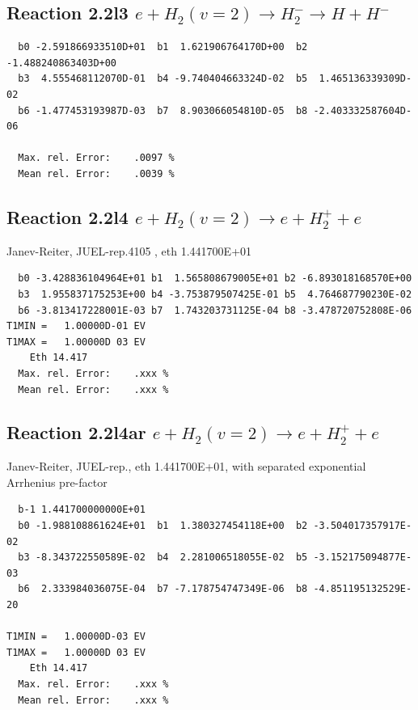 \documentclass[12pt,dvipdfmx]{article}
\begin{document}
\newpage

\subsection{
Reaction 2.2l3
 $ e + H_2(v=2) \rightarrow H_2^- \rightarrow H + H^-$
}


\begin{small}\begin{verbatim}
  b0 -2.591866933510D+01  b1  1.621906764170D+00  b2 -1.488240863403D+00
  b3  4.555468112070D-01  b4 -9.740404663324D-02  b5  1.465136339309D-02
  b6 -1.477453193987D-03  b7  8.903066054810D-05  b8 -2.403332587604D-06

  Max. rel. Error:    .0097 %
  Mean rel. Error:    .0039 %
\end{verbatim}\end{small}

\subsection{
Reaction 2.2l4
 $ e + H_2(v=2) \rightarrow e + H_2^+  + e$
}
Janev-Reiter, JUEL-rep.4105 \cite{kn:JRS}, eth 1.441700E+01

\begin{small}\begin{verbatim}
  b0 -3.428836104964E+01 b1  1.565808679005E+01 b2 -6.893018168570E+00
  b3  1.955837175253E+00 b4 -3.753879507425E-01 b5  4.764687790230E-02
  b6 -3.813417228001E-03 b7  1.743203731125E-04 b8 -3.478720752808E-06
T1MIN =   1.00000D-01 EV
T1MAX =   1.00000D 03 EV
    Eth 14.417
  Max. rel. Error:    .xxx %
  Mean rel. Error:    .xxx %
\end{verbatim}\end{small}

\subsection{
Reaction 2.2l4ar
 $ e + H_2(v=2) \rightarrow e + H_2^+  + e$
}
Janev-Reiter, JUEL-rep., eth 1.441700E+01,
with separated exponential Arrhenius pre-factor

\begin{small}\begin{verbatim}
  b-1 1.441700000000E+01
  b0 -1.988108861624E+01  b1  1.380327454118E+00  b2 -3.504017357917E-02
  b3 -8.343722550589E-02  b4  2.281006518055E-02  b5 -3.152175094877E-03
  b6  2.333984036075E-04  b7 -7.178754747349E-06  b8 -4.851195132529E-20

T1MIN =   1.00000D-03 EV
T1MAX =   1.00000D 03 EV
    Eth 14.417
  Max. rel. Error:    .xxx %
  Mean rel. Error:    .xxx %
\end{verbatim}\end{small}
\newpage
\end{document}
